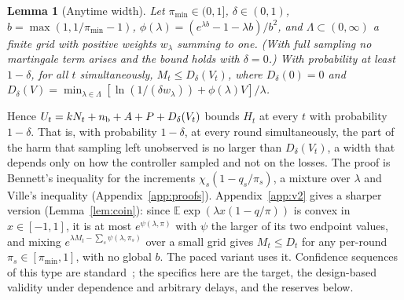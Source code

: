 \documentclass[10pt]{article}
\theoremstyle{plain}
\newtheorem{lemma}{Lemma}
\theoremstyle{definition}
\newcommand{\E}{\mathbb{E}}
\begin{document}
\begin{samepage}
\begin{lemma}[Anytime width]\label{lem:bennett}
Let $\pi_{\min}\in(0,1]$, $\delta\in(0,1)$, $b=\max(1,1/\pi_{\min}-1)$, $\phi(\lambda)=(e^{\lambda b}-1-\lambda b)/b^2$, and $\Lambda\subset(0,\infty)$ a finite grid with positive weights $w_\lambda$ summing to one. (With full sampling no martingale term arises and the bound holds with $\delta=0$.) With probability at least $1-\delta$, for all $t$ simultaneously, $M_t\le D_\delta(V_t)$, where $D_\delta(0)=0$ and $D_\delta(V)=\min_{\lambda\in\Lambda}[\ln(1/(\delta w_\lambda))+\phi(\lambda)V]/\lambda$.
\end{lemma}
\end{samepage}
Hence $U_t=kN_t+n_{\rm b}+A+P+D_\delta(V_t)$ bounds $H_t$ at every $t$ with probability $1-\delta$. That is, with probability $1-\delta$, at every round simultaneously, the part of the harm that sampling left unobserved is no larger than $D_\delta(V_t)$, a width that depends only on how the controller sampled and not on the losses. The proof is Bennett's inequality for the increments $\chi_s(1-q_s/\pi_s)$, a mixture over $\lambda$ and Ville's inequality (Appendix~\ref{app:proofs}). Appendix~\ref{app:v2} gives a sharper version (Lemma~\ref{lem:coin}): since $\E\exp(\lambda x(1-q/\pi))$ is convex in $x\in[-1,1]$, it is at most $e^{\psi(\lambda,\pi)}$ with $\psi$ the larger of its two endpoint values, and mixing $e^{\lambda M_t-\sum_s\psi(\lambda,\pi_s)}$ over a small grid gives $M_t\le D_t$ for any per-round $\pi_s\in[\pi_{\min},1]$, with no global $b$. The paced variant uses it. Confidence sequences of this type are standard~\citep{howard2021time,waudbysmith2024betting}; the specifics here are the target, the design-based validity under dependence and arbitrary delays, and the reserves below.
\end{document}
